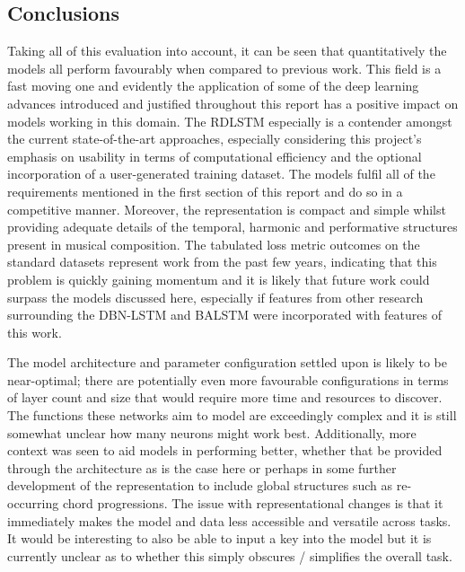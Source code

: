 \documentclass[12pt,]{article}
\begin{document}
\hypertarget{conclusions}{%
\subsection{Conclusions}\label{conclusions}}

Taking all of this evaluation into account, it can be seen that
quantitatively the models all perform favourably when compared to
previous work. This field is a fast moving one and evidently the
application of some of the deep learning advances introduced and
justified throughout this report has a positive impact on models working
in this domain. The RDLSTM especially is a contender amongst the current
state-of-the-art approaches, especially considering this project's
emphasis on usability in terms of computational efficiency and the
optional incorporation of a user-generated training dataset. The models
fulfil all of the requirements mentioned in the first section of this
report and do so in a competitive manner. Moreover, the representation
is compact and simple whilst providing adequate details of the temporal,
harmonic and performative structures present in musical composition. The
tabulated loss metric outcomes on the standard datasets represent work
from the past few years, indicating that this problem is quickly gaining
momentum and it is likely that future work could surpass the models
discussed here, especially if features from other research surrounding
the DBN-LSTM and BALSTM were incorporated with features of this work.

The model architecture and parameter configuration settled upon is
likely to be near-optimal; there are potentially even more favourable
configurations in terms of layer count and size that would require more
time and resources to discover. The functions these networks aim to
model are exceedingly complex and it is still somewhat unclear how many
neurons might work best. Additionally, more context was seen to aid
models in performing better, whether that be provided through the
architecture as is the case here or perhaps in some further development
of the representation to include global structures such as re-occurring
chord progressions. The issue with representational changes is that it
immediately makes the model and data less accessible and versatile
across tasks. It would be interesting to also be able to input a key
into the model but it is currently unclear as to whether this simply
obscures / simplifies the overall task.
\end{document}
